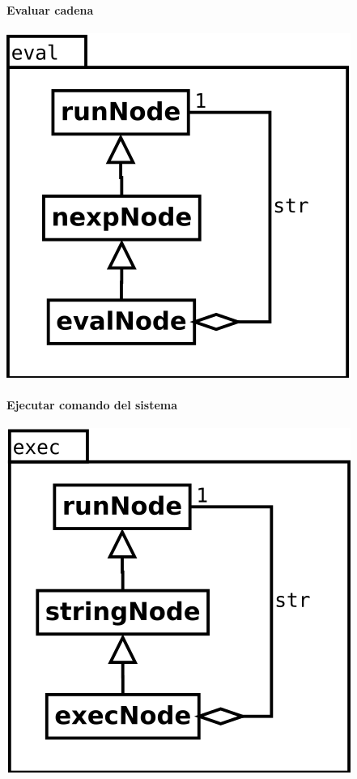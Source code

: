 \begin{multicols}{2}
   \paragraph {Evaluar cadena} 
   \begin{center}
   \includegraphics[scale=0.4]{eval.png} \\
   \end{center}
\columnbreak
   \paragraph {Ejecutar comando del sistema} 
   \begin{center}
   \includegraphics[scale=0.4]{exec.png} \\
   \end{center}
\end{multicols}

